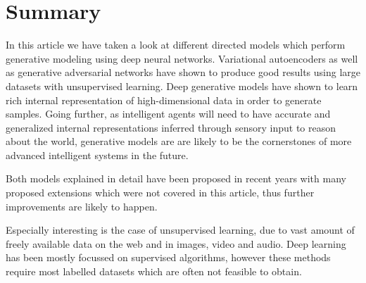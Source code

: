 \section{Summary}
\label{sec:summary}

In this article we have taken a look at different directed models which perform generative modeling using deep neural networks.
Variational autoencoders as well as generative adversarial networks have shown to produce good results using large datasets with unsupervised learning.
Deep generative models have shown to learn rich internal representation of high-dimensional data in order to generate samples.
Going further, as intelligent agents will need to have accurate and generalized internal representations inferred through sensory input to reason about the world, generative models are are likely to be the cornerstones of more advanced intelligent systems in the future.

Both models explained in detail have been proposed in recent years with many proposed extensions which were not covered in this article, thus further improvements are likely to happen.

Especially interesting is the case of unsupervised learning, due to vast amount of freely available data on the web and in images, video and audio. Deep learning has been mostly focussed on supervised algorithms, however these methods require most labelled datasets which are often not feasible to obtain.




